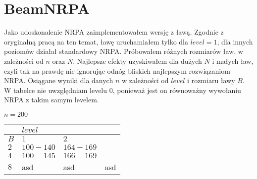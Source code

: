 \documentclass[a4paper,10pt]{article}
\begin{document}
\section{BeamNRPA}
Jako udoskonalenie NRPA zaimplementowałem wersję z ławą. Zgodnie z oryginalną pracą na ten temat, ławę uruchamiałem tylko dla $level=1$,
dla innych poziomów działał standardowy NRPA. Próbowałem różnych rozmiarów ław, w zależności od $n$ oraz $N$. Najlepsze efekty uzyskiwałem
dla dużych $N$ i małych ław, czyli tak na prawdę nie ignorując odnóg bliskich najlepszym rozwiązaniom NRPA. Osiągane wyniki dla danych $n$ w
zależności od $level$ i rozmiaru ławy $B$. W tabelce nie uwzględniam levelu 0, ponieważ jest on równoważny wywołaniu NRPA z takim samym levelem.

$n = 200$

\begin{adjustbox}{center}
\begin{tabularx}{0.7\linewidth}{|X|X|X|X| }
  \hline
  & \multicolumn{3}{|X|}{$level$} \\
  \hline
  $B$ & $1$ & $2$ \\
  \hline
  $2$ & $100-140$ & $164-169$ \\
  \hline
  $4$ & $100-145$ & $166-169$ \\
  \hline
  $8$ & asd & asd & asd \\
  \hline
\end{tabularx}
\end{adjustbox}
\end{document}
